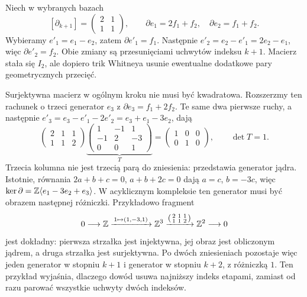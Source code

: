 \begin{przyklad}
Niech w wybranych bazach
\[
 [\partial_{k+1}]
 =\begin{pmatrix}2&1\\1&1\end{pmatrix},
 \qquad
 \partial e_1=2f_1+f_2,\quad
 \partial e_2=f_1+f_2.
\]
Wybieramy
$e'_1=e_1-e_2$, zatem
$\partial e'_1=f_1$.
Następnie
$e'_2=e_2-e'_1=2e_2-e_1$,
więc $\partial e'_2=f_2$.
Obie zmiany są przesunięciami
uchwytów indeksu $k+1$.
Macierz stała się $I_2$,
ale dopiero trik Whitneya
usunie ewentualne
dodatkowe pary
geometrycznych przecięć.

Surjektywna macierz w ogólnym kroku nie musi być kwadratowa.
Rozszerzmy ten rachunek o trzeci generator $e_3$ z
$\partial e_3=f_1+2f_2$. Te same dwa pierwsze ruchy,
a następnie $e'_3=e_3-e'_1-2e'_2=e_3+e_1-3e_2$, dają
\[
 \begin{pmatrix}2&1&1\\1&1&2\end{pmatrix}
 \underbrace{\begin{pmatrix}1&-1&1\\-1&2&-3\\0&0&1\end{pmatrix}}_{T}
 =\begin{pmatrix}1&0&0\\0&1&0\end{pmatrix},\qquad \det T=1.
\]
Trzecia kolumna nie jest trzecią parą do zniesienia:
przedstawia generator jądra. Istotnie, równania
$2a+b+c=0$, $a+b+2c=0$ dają $a=c$, $b=-3c$,
więc $\ker\partial=\mathbb{Z}\langle e_1-3e_2+e_3\rangle$.
W acyklicznym kompleksie ten generator musi być obrazem
następnej różniczki. Przykładowo fragment
\[
 0\longrightarrow\mathbb{Z}
 \xrightarrow{\,1\mapsto(1,-3,1)\,}\mathbb{Z}^3
 \xrightarrow{\left(\begin{smallmatrix}2&1&1\\1&1&2\end{smallmatrix}\right)}
 \mathbb{Z}^2\longrightarrow0
\]
jest dokładny: pierwsza strzałka jest injektywna, jej obraz
jest obliczonym jądrem, a druga strzałka jest surjektywna.
Po dwóch zniesieniach pozostaje więc jeden generator w stopniu
$k+1$ i generator w stopniu $k+2$, z różniczką $1$.
Ten przykład wyjaśnia, dlaczego dowód usuwa najniższy indeks
etapami, zamiast od razu parować wszystkie uchwyty dwóch indeksów.
\end{przyklad}

